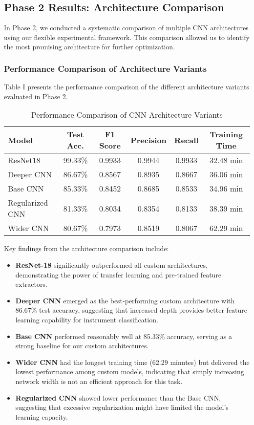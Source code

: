 \subsection{Phase 2 Results: Architecture Comparison}
In Phase 2, we conducted a systematic comparison of multiple CNN architectures using our flexible experimental framework. This comparison allowed us to identify the most promising architecture for further optimization.

\subsubsection{Performance Comparison of Architecture Variants}
Table I presents the performance comparison of the different architecture variants evaluated in Phase 2.

\begin{table}[ht]
\caption{Performance Comparison of CNN Architecture Variants}
\centering
\begin{tabular}{lccccc}
\toprule
\textbf{Model} & \textbf{Test Acc.} & \textbf{F1 Score} & \textbf{Precision} & \textbf{Recall} & \textbf{Training Time} \\
\midrule
ResNet18 & 99.33\% & 0.9933 & 0.9944 & 0.9933 & 32.48 min \\
Deeper CNN & 86.67\% & 0.8567 & 0.8935 & 0.8667 & 36.06 min \\
Base CNN & 85.33\% & 0.8452 & 0.8685 & 0.8533 & 34.96 min \\
Regularized CNN & 81.33\% & 0.8034 & 0.8354 & 0.8133 & 38.39 min \\
Wider CNN & 80.67\% & 0.7973 & 0.8519 & 0.8067 & 62.29 min \\
\bottomrule
\end{tabular}
\end{table}

Key findings from the architecture comparison include:
\begin{itemize}
    \item \textbf{ResNet-18} significantly outperformed all custom architectures, demonstrating the power of transfer learning and pre-trained feature extractors.
    
    \item \textbf{Deeper CNN} emerged as the best-performing custom architecture with 86.67\% test accuracy, suggesting that increased depth provides better feature learning capability for instrument classification.
    
    \item \textbf{Base CNN} performed reasonably well at 85.33\% accuracy, serving as a strong baseline for our custom architectures.
    
    \item \textbf{Wider CNN} had the longest training time (62.29 minutes) but delivered the lowest performance among custom models, indicating that simply increasing network width is not an efficient approach for this task.
    
    \item \textbf{Regularized CNN} showed lower performance than the Base CNN, suggesting that excessive regularization might have limited the model's learning capacity.
\end{itemize}

